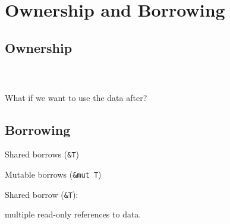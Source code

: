 \documentclass{beamer}
\begin{document}
\section{Ownership and Borrowing}

\subsection{Ownership}

\begin{frame}
    \inputminted[fontsize=\scriptsize]{rust}{code/ownership.rs}
\end{frame}

\begin{frame}
    \inputminted[fontsize=\scriptsize]{rust}{code/ownership2.rs}
\end{frame}

\begin{frame}
    \inputminted[fontsize=\scriptsize]{rust}{code/ownership3.rs}
\end{frame}

\begin{frame}
    \begin{center}
        What if we want to use the data after?
    \end{center}
\end{frame}

\subsection{Borrowing}

\begin{frame}
    \begin{center}
        Shared borrows (\texttt{\&T})

        \vspace{3em}

        Mutable borrows (\texttt{\&mut T})
    \end{center}
\end{frame}

\begin{frame}
    \begin{center}
        Shared borrow (\texttt{\&T}):

        \vspace{3em}

        multiple read-only references to data.
    \end{center}
\end{frame}
\end{document}
